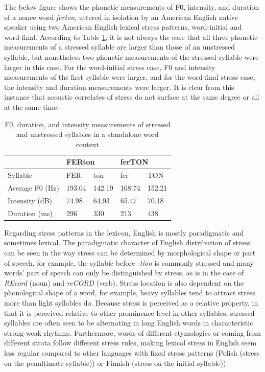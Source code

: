 \documentclass[a4paper]{article}
\begin{document}
The below figure shows the phonetic measurements of F0, intensity, and duration of a nonce word \textit{ferton}, uttered in isolation by an American English native speaker using two American English lexical stress patterns, word-initial and word-final. According to Table \ref{tab:table1}, it is not always the case that all three phonetic measurements of a stressed syllable are larger than those of an unstressed syllable, but nonetheless two phonetic measurements of the stressed syllable were larger in this case. For the word-initial stress case, F0 and intensity measurements of the first syllable were larger, and for the word-final stress case, the intensity and duration measurements were larger. It is clear from this instance that acoustic correlates of stress do not surface at the same degree or all at the same time.

\begin{table}[!h]
  \begin{center}
      \caption{F0, duration, and intensity measurements of stressed and unstressed syllables in a standalone word context}
\begin{tabular}{lllll}
    \label{tab:table1}
              & \multicolumn{2}{l}{FERton} & \multicolumn{2}{l}{ferTON}  \\ \hline
 Syllable & FER          & ton          &   fer          &      TON         \\ \hline
Average F0 (Hz) & 193.04          & 142.19          &   168.74           &      152.21         \\ \hline
Intensity (dB)    & 74.98           & 64.93           &      65.47        &         70.18    \\ \hline
Duration (ms)     & 296          & 330        &       213      &      438
\end{tabular}
\end{center}
\end{table}

Regarding stress patterns in the lexicon, English is mostly paradigmatic and sometimes lexical. The paradigmatic character of English distribution of stress can be seen in the way stress can be determined by morphological shape or part of speech, for example, the syllable before \textit{-tion} is commonly stressed and many words' part of speech can only be distinguished by stress, as is in the case of \textit{REcord} (noun) and \textit{reCORD} (verb). Stress location is also dependent on the phonological shape of a word, for example, heavy syllables tend to attract stress more than light syllables do. Because stress is perceived as a relative property, in that it is perceived relative to other prominence level in other syllables, stressed syllables are often seen to be alternating in long English words in characteristic strong-weak rhythms. Furthermore, words of different etymologies or coming from different strata follow different stress rules, making lexical stress in English seem less regular compared to other languages with fixed stress patterns (Polish (stress on the penultimate syllable)) or Finnish (stress on the initial syllable)).
\end{document}
